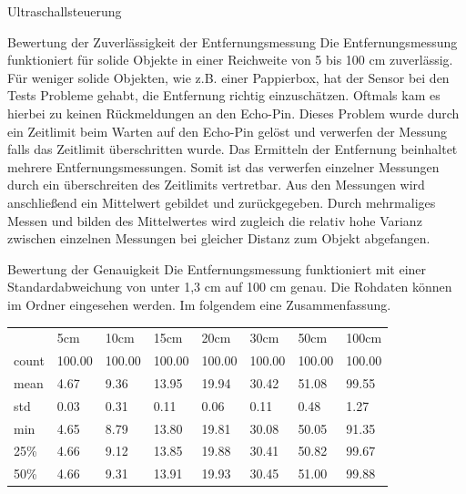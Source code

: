 \documentclass[12pt]{report}
\begin{document}
\begin{section}{Ultraschallsteuerung}
    \begin{subsection}{Bewertung der Zuverlässigkeit der Entfernungsmessung}
      Die Entfernungsmessung funktioniert für solide Objekte in einer Reichweite
      von 5 bis 100 cm zuverlässig. Für weniger solide Objekten, wie z.B. einer
      Pappierbox, hat der Sensor bei den Tests Probleme
      gehabt, die Entfernung richtig einzuschätzen. Oftmals kam es hierbei zu keinen Rückmeldungen an den Echo-Pin. Dieses
      Problem wurde durch ein Zeitlimit beim Warten auf den Echo-Pin gelöst und
      verwerfen der Messung falls das Zeitlimit überschritten wurde. Das
      Ermitteln der Entfernung beinhaltet mehrere Entfernungsmessungen. Somit
      ist das verwerfen einzelner Messungen durch ein überschreiten des
      Zeitlimits vertretbar. Aus den Messungen wird anschließend ein Mittelwert
      gebildet und zurückgegeben. Durch mehrmaliges Messen und bilden des
      Mittelwertes wird zugleich die relativ hohe Varianz zwischen einzelnen
      Messungen bei gleicher Distanz zum Objekt abgefangen.
    \end{subsection}
    \begin{subsection}{Bewertung der Genauigkeit}
      Die Entfernungsmessung funktioniert mit einer Standardabweichung von unter
      1,3 cm auf 100 cm genau.
      Die Rohdaten können im Ordner
       eingesehen werden.
      Im folgendem eine Zusammenfassung.
      \begin{table}[h!]
        \begin{tabularx}{\textwidth}{XXXXXXXX}
            {} &     5cm &    10cm &    15cm &    20cm &    30cm &    50cm &   100cm \\
            count &  100.00 &  100.00 &  100.00 &  100.00 &  100.00 &  100.00 &  100.00 \\
            mean  &    4.67 &    9.36 &   13.95 &   19.94 &   30.42 &   51.08 &   99.55 \\
            std   &    0.03 &    0.31 &    0.11 &    0.06 &    0.11 &    0.48 &    1.27 \\
            min   &    4.65 &    8.79 &   13.80 &   19.81 &   30.08 &   50.05 &   91.35 \\
            25\%   &    4.66 &    9.12 &   13.85 &   19.88 &   30.41 &   50.82 &   99.67 \\
            50\%   &    4.66 &    9.31 &   13.91 &   19.93 &   30.45 &   51.00 &   99.88 \\

\end{tabularx}
\end{table}
\end{subsection}
\end{section}
\end{document}
